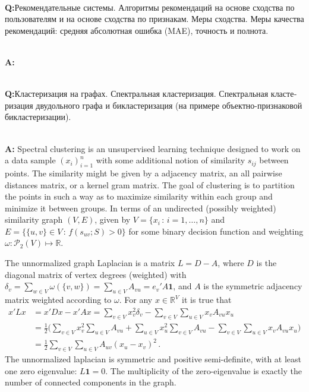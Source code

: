 \documentclass[a4paper]{article}
\newcommand{\Real}{\mathbb{R}}
\newcommand{\one}{\mathbf{1}}
\newcommand{\rus}[1]{\foreignlanguage{russian}{#1}}
\begin{document}
\hfill\\\textbf{Q:}\rus{Рекомендательные системы. Алгоритмы рекомендаций на основе
сходства по пользователям и на основе сходства по признакам. Меры сходства. Меры
качества рекомендаций: средняя абсолютная ошибка (MAE), точность и полнота.}

\hfill\\\textbf{A:}

\hfill\\\textbf{Q:}\rus{Кластеризация на графах. Спектральная кластеризация. Спектральная
кластеризация двудольного графа и бикластеризация (на примере объектно-признаковой
бикластеризации).}

\hfill\\\textbf{A:}
Spectral clustering is an unsupervised learning technique designed to work on a data
sample $(x_i)_{i=1}^n$ with some additional notion of similarity $s_{ij}$ between
points. The similarity might be given by a adjacency matrix, an all pairwise distances
matrix, or a kernel gram matrix. The goal of clustering is to partition the points
in such a way as to maximize similarity within each group and minimize it between
groups. In terms of an undirected (possibly weighted) similarity graph $(V, E)$,
given by $V = \{x_i \,:\, i=1,\ldots, n\}$ and $E = \{\{u, v\}\in V\,:\, f(s_{uv}; S) > 0\}$
for some binary decision function and weighting $\omega:\mathcal{P}_2(V)\mapsto
\Real$.

The unnormalized graph Laplacian is a matrix $L = D - A$, where $D$ is the diagonal
matrix of vertex degrees (weighted) with $\delta_v = \sum_{w\in V} \omega(\{v, w\})
= \sum_{u\in V} A_{vu} = e_v' A \one$, and $A$ is the symmetric adjacency matrix
weighted according to $\omega$. For any $x\in\Real^V$ it is true that
\begin{align*}
x' L x
    &= x' D x - x' A x = \sum_{v\in V} x_v^2 \delta_v
     - \sum_{v\in V} \sum_{u\in V} x_v A_{vu} x_u \\
    &= \frac{1}{2}\bigl(\sum_{v\in V} x_v^2 \sum_{u\in V} A_{vu} 
     + \sum_{u\in V} x_u^2 \sum_{v\in V} A_{vu}
     - \sum_{v\in V} \sum_{u\in V} x_v A_{vu} x_u \bigr)\\
    &= \frac{1}{2} \sum_{v\in V} \sum_{u\in V} A_{uv} (x_u - x_v)^2 \,.
\end{align*}
The unnormalized laplacian is symmetric and positive semi-definite, with at least
one zero eigenvalue: $L\one = 0$. The multiplicity of the zero-eigenvalue is exactly
the number of connected components in the graph.
\end{document}
